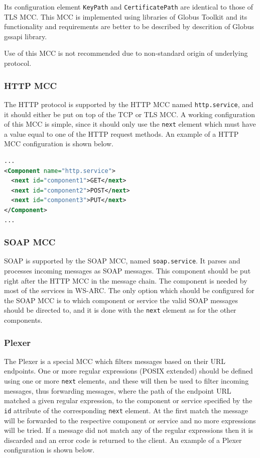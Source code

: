 \documentclass{article}
\begin{document}
Its configuration element \texttt{KeyPath} and \texttt{CertificatePath} are 
identical to those of TLS MCC. This MCC is implemented using libraries of 
Globus Toolkit and its functionality and requirements are better to be 
described by descrition of Globus gssapi library.

Use of this MCC is not recommended due to non-standard origin of underlying
protocol.

\subsubsection{HTTP MCC}\label{sec:http-mcc}
The HTTP protocol is supported by the HTTP MCC named \texttt{http.service}, and
it should either be put on top of the TCP or TLS MCC. A working configuration of
this MCC is simple, since it should only use the \texttt{next} element which
must have a value equal to one of the HTTP request methods. An example of a HTTP
MCC configuration is shown below.

\begin{lstlisting}[language=xml]
...
<Component name="http.service">
  <next id="component1">GET</next>
  <next id="component2">POST</next>
  <next id="component3">PUT</next>
</Component>
...
\end{lstlisting}

\subsubsection{SOAP MCC}\label{sec:soap-mcc}
SOAP is supported by the SOAP MCC, named \texttt{soap.service}. It parses and
processes incoming messages as SOAP messages. This component should be put right
after the HTTP MCC in the message chain. The component is needed by most of the
services in WS-ARC. The only option which should be configured for the SOAP MCC
is to which component or service the valid SOAP messages should be directed to,
and it is done with the \texttt{next} element as for the other components.

\subsubsection{Plexer}\label{sec:plexer}
The Plexer is a special MCC which filters messages based on their URL endpoints.
One or more regular expressions (POSIX extended) should be defined using one or
more \texttt{next} elements, and these will then be used to filter incoming
messages, thus forwarding messages, where the path of the endpoint URL matched a
given regular expression, to the component or service specified by the
\texttt{id} attribute of the corresponding \texttt{next} element. At the first
match the message will be forwarded to the respective component or service and
no more expressions will be tried. If a message did not match any of the regular
expressions then it is discarded and an error code is returned to the client. An
example of a Plexer configuration is shown below.
\end{document}
